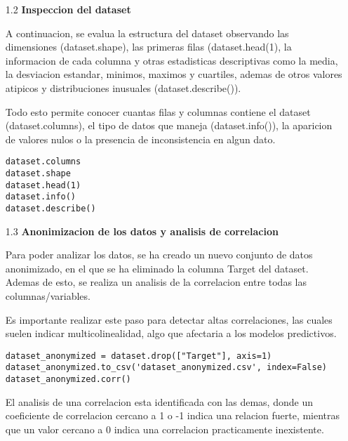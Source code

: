 \documentclass{article}
\begin{document}
\begin{itemize}

\item[1.2]  {\bf Inspeccion del dataset}

A continuacion, se evalua la estructura del dataset observando las dimensiones (dataset.shape), las primeras filas (dataset.head(1), la informacion de cada columna y otras estadisticas descriptivas como la media, la desviacion estandar, minimos, maximos y cuartiles, ademas de otros valores atipicos y distribuciones inusuales (dataset.describe()).

Todo esto permite conocer cuantas filas y columnas contiene el dataset (dataset.columns), el tipo de datos que maneja (dataset.info()), la aparicion de valores nulos o la presencia de inconsistencia en algun dato.

\begin{tcolorbox}[width=14cm]
\begin{scriptsize}
\begin{verbatim}
dataset.columns
dataset.shape
dataset.head(1)
dataset.info()
dataset.describe()
\end{verbatim}
\end{scriptsize}
\end{tcolorbox}

\end{itemize}

\bigskip

\begin{itemize}

\item[1.3]  {\bf Anonimizacion de los datos y analisis de correlacion}

Para poder analizar los datos, se ha creado un nuevo conjunto de datos anonimizado, en el que se ha eliminado la columna Target del dataset. Ademas de esto, se realiza un analisis de la correlacion entre todas las columnas/variables.

Es importante realizar este paso para detectar altas correlaciones, las cuales suelen indicar multicolinealidad, algo que afectaria a los modelos predictivos.

\begin{tcolorbox}[width=14cm]
\begin{scriptsize}
\begin{verbatim}
dataset_anonymized = dataset.drop(["Target"], axis=1)
dataset_anonymized.to_csv('dataset_anonymized.csv', index=False)
dataset_anonymized.corr()
\end{verbatim}
\end{scriptsize}
\end{tcolorbox}

El analisis de una correlacion esta identificada con las demas, donde un coeficiente de correlacion cercano a 1 o -1 indica una relacion fuerte, mientras que un valor cercano a 0 indica una correlacion practicamente inexistente.

\end{itemize}
\end{document}
